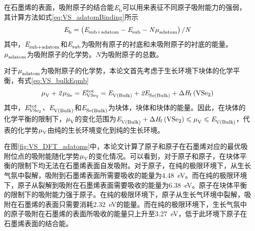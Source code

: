     在石墨烯的表面，吸附原子的结合能$\it E_{\rm b}^{\rm } \it$可以用来表征不同原子吸附能力的强弱，其计算方法如式\eqref{eq:VS_adatomBinding}所示\chinesecolon
    \begin{equation}
        \label{eq:VS_adatomBinding}
        \it E_{\rm b}^{\rm } \it=\left(\it E_{\rm sub+adatom}^{\rm } \it-\it E_{\rm sub}^{\rm } \it-N\it \mu_{\rm adatom}^{\rm } \it\right)/ N
    \end{equation}
    其中，$\it E_{\rm sub+adatom}^{\rm } \it$和$\it E_{\rm sub}^{\rm } \it$为吸附有原子的衬底和未吸附原子的衬底的能量。$\it \mu_{\rm adatom}^{\rm } \it$为吸附原子的化学势。$N$为吸附原子的总数。

    对于$\it \mu_{\rm adatom}^{\rm } \it$为吸附原子的化学势，本论文首先考虑于生长环境下块体的化学平衡，有式\eqref{eq:VS_bulkEqmb}\chinesecolon
    \begin{equation}
        \label{eq:VS_bulkEqmb}
        \muVar{V}{}+2\muVar{Se}{}=\energyVar{\ce{VSe2}}{tot}=\energyVar{V\left(Bulk\right)}{}+2\energyVar{Se\left(Bulk\right)}{}+\rm{\Delta} \it H_{\rm f}\left(\ce{VSe2}\right)
    \end{equation}
    其中，$\energyVar{\ce{VSe2}}{tot}$、$\it E_{\rm V\left(Bulk\right)}^{\rm } \it$和$\it E_{\rm Se\left(Bulk\right)}^{\rm } \it$为块体，块体和块体的能量。因此，在块体的化学平衡的限制下，$\it \mu_{\rm V}^{\rm } \it$的变化范围为$\energyVar{V\left(Bulk\right)}{}+\rm{\Delta} \it H_{\rm f}\left(\ce{VSe2}\right) \leqslant \muVar{V}{}  \leqslant \energyVar{V\left(Bulk\right)}{}$，代表的化学势$\it \mu_{\rm V}^{\rm } \it$由纯的生长环境变化到纯的生长环境。

    在图\ref{fig:VS_DFT_adatoms}中，本论文计算了原子和原子在石墨烯对应的最优吸附位点的吸附能随化学势$\it \mu_{\rm V}^{\rm } \it$的变化情况。可以看到，对于原子和原子，在块体平衡的限制下均无法在石墨烯表面自发吸附。对于原子，在纯的极限环境下，从生长气氛中裂解，吸附到石墨烯表面所需要吸收的能量为\SI{4.48}{\electronvolt}。而在纯的极限环境下，原子从裂解到吸附在石墨烯表面需要吸收的能量为\SI{6.38}{\electronvolt}。原子在块体平衡的限制下的吸附能力强于原子。在纯的极限环境下，原子从生长气环境中裂解，吸附在石墨烯的表面只需要消耗\SI{2.32}{\electronvolt}的能量。而在纯的极限环境下，生长气氛中的原子吸附在石墨烯的表面所吸收的能量只上升至\SI{3.27}{\electronvolt}，低于此环境下原子在石墨烯表面的结合能。

